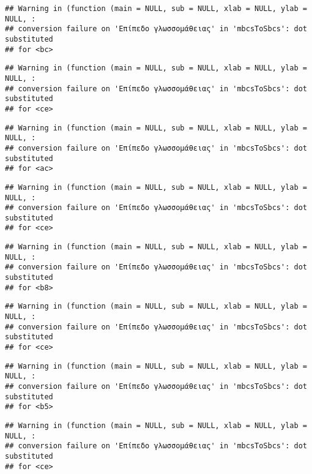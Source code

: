 \documentclass[
]{article}
\begin{document}
\begin{verbatim}
## Warning in (function (main = NULL, sub = NULL, xlab = NULL, ylab = NULL, :
## conversion failure on 'Επίπεδο γλωσσομάθειας' in 'mbcsToSbcs': dot substituted
## for <bc>
\end{verbatim}

\begin{verbatim}
## Warning in (function (main = NULL, sub = NULL, xlab = NULL, ylab = NULL, :
## conversion failure on 'Επίπεδο γλωσσομάθειας' in 'mbcsToSbcs': dot substituted
## for <ce>
\end{verbatim}

\begin{verbatim}
## Warning in (function (main = NULL, sub = NULL, xlab = NULL, ylab = NULL, :
## conversion failure on 'Επίπεδο γλωσσομάθειας' in 'mbcsToSbcs': dot substituted
## for <ac>
\end{verbatim}

\begin{verbatim}
## Warning in (function (main = NULL, sub = NULL, xlab = NULL, ylab = NULL, :
## conversion failure on 'Επίπεδο γλωσσομάθειας' in 'mbcsToSbcs': dot substituted
## for <ce>
\end{verbatim}

\begin{verbatim}
## Warning in (function (main = NULL, sub = NULL, xlab = NULL, ylab = NULL, :
## conversion failure on 'Επίπεδο γλωσσομάθειας' in 'mbcsToSbcs': dot substituted
## for <b8>
\end{verbatim}

\begin{verbatim}
## Warning in (function (main = NULL, sub = NULL, xlab = NULL, ylab = NULL, :
## conversion failure on 'Επίπεδο γλωσσομάθειας' in 'mbcsToSbcs': dot substituted
## for <ce>
\end{verbatim}

\begin{verbatim}
## Warning in (function (main = NULL, sub = NULL, xlab = NULL, ylab = NULL, :
## conversion failure on 'Επίπεδο γλωσσομάθειας' in 'mbcsToSbcs': dot substituted
## for <b5>
\end{verbatim}

\begin{verbatim}
## Warning in (function (main = NULL, sub = NULL, xlab = NULL, ylab = NULL, :
## conversion failure on 'Επίπεδο γλωσσομάθειας' in 'mbcsToSbcs': dot substituted
## for <ce>
\end{verbatim}
\end{document}
